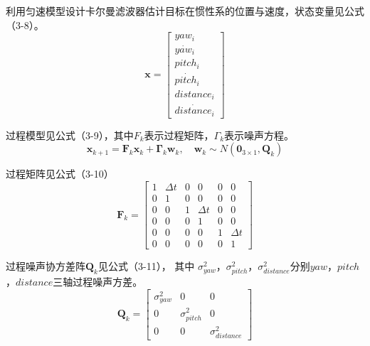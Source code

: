 利用匀速模型设计卡尔曼滤波器估计目标在惯性系的位置与速度，状态变量见公式（3-8）。\begin{equation} \boldsymbol x =\left[\begin{array}{c} yaw_i\\ \dot {yaw_i}\\ pitch_i\\ \dot {pitch_i} \\ distance_i\\ \dot {distance_i} \end{array}\right] \end{equation}
\par
过程模型见公式（3-9），其中$F_k$表示过程矩阵，$\Gamma_{k}$表示噪声方程。
\begin{equation} \boldsymbol  x_{k+1} = \boldsymbol F_k\boldsymbol  x_k + \boldsymbol{\Gamma}_{k}\boldsymbol {w}_{k}, \quad \boldsymbol {w}_{k} \sim N\left(\boldsymbol 0_{3 \times 1}, \boldsymbol Q_k \right) \end{equation}

过程矩阵见公式（3-10）
\begin{equation} \boldsymbol F_k =\left[\begin{array}{cccccc} 1 &  \Delta t & 0 &0&0&0\\ 0 &  1 & 0 &0&0&0\\ 0 & 0 & 1&  \Delta t & 0 &0\\ 0&0&   0&1 &0 &0\\ 0 &0& 0 &0& 1 &\Delta t \\ 0 &0& 0 & 0 &0 &1 \end{array}\right] \end{equation}

过程噪声协方差阵$\boldsymbol Q_k$见公式（3-11）， 其中 $\sigma_{yaw}^2$，$\sigma_{pitch}^2$，$\sigma_{distance}^2$分别$yaw$，$pitch$，$distance$三轴过程噪声方差。
\begin{equation} \boldsymbol Q_k =\left[\begin{array}{ccc} \sigma_{yaw}^2 &  0 & 0 \\ 0 &  \sigma_{pitch}^2 & 0 \\ 0 & 0 & \sigma_{distance}^2 \end{array}\right] \end{equation}
\par


